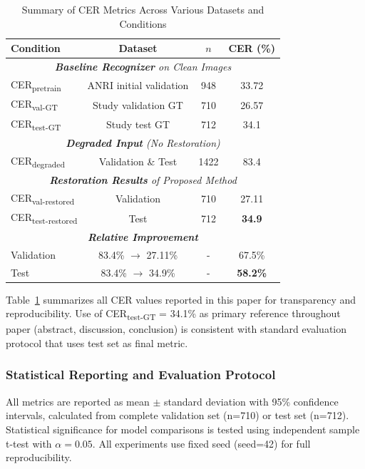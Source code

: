 \documentclass[journal]{IEEEtran}
\begin{document}
\begin{table}[!t]
\centering
\caption{Summary of CER Metrics Across Various Datasets and Conditions}
\label{table:cer_summary}
\small
\begin{tabular}{|l|c|c|c|}
\hline
\textbf{Condition} & \textbf{Dataset} & \textbf{$n$} & \textbf{CER (\%)} \\
\hline
\multicolumn{4}{|c|}{\textit{\textbf{Baseline Recognizer} on Clean Images}} \\
\hline
CER\textsubscript{pretrain} & ANRI initial validation & 948 & 33.72 \\
CER\textsubscript{val-GT} & Study validation GT & 710 & 26.57 \\
CER\textsubscript{test-GT} & Study test GT & 712 & 34.1 \\
\hline
\multicolumn{4}{|c|}{\textit{\textbf{Degraded Input} (No Restoration)}} \\
\hline
CER\textsubscript{degraded} & Validation \& Test & 1422 & 83.4 \\
\hline
\multicolumn{4}{|c|}{\textit{\textbf{Restoration Results} of Proposed Method}} \\
\hline
CER\textsubscript{val-restored} & Validation & 710 & 27.11 \\
CER\textsubscript{test-restored} & Test & 712 & \textbf{34.9} \\
\hline
\multicolumn{4}{|c|}{\textit{\textbf{Relative Improvement}}} \\
\hline
Validation & 83.4\% $\rightarrow$ 27.11\% & - & 67.5\% \\
Test & 83.4\% $\rightarrow$ 34.9\% & - & \textbf{58.2\%} \\
\hline
\end{tabular}
\end{table}

Table~\ref{table:cer_summary} summarizes all CER values reported in this paper for transparency and reproducibility. Use of CER\textsubscript{test-GT} = 34.1\% as primary reference throughout paper (abstract, discussion, conclusion) is consistent with standard evaluation protocol that uses test set as final metric.

\subsubsection{Statistical Reporting and Evaluation Protocol}

All metrics are reported as mean $\pm$ standard deviation with 95\% confidence intervals, calculated from complete validation set (n=710) or test set (n=712). Statistical significance for model comparisons is tested using independent sample t-test with $\alpha = 0.05$. All experiments use fixed seed (seed=42) for full reproducibility.
\end{document}
